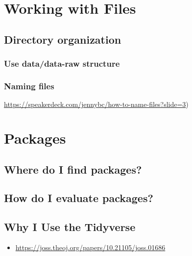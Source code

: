 \documentclass[]{book}
\providecommand{\tightlist}{%
  \setlength{\itemsep}{0pt}\setlength{\parskip}{0pt}}
\begin{document}
\hypertarget{working-with-files}{%
\section{Working with Files}\label{working-with-files}}

\hypertarget{directory-organization}{%
\subsection{Directory organization}\label{directory-organization}}

\hypertarget{use-datadata-raw-structure}{%
\subsubsection{Use data/data-raw structure}\label{use-datadata-raw-structure}}

\hypertarget{naming-files}{%
\subsubsection{Naming files}\label{naming-files}}

\url{https://speakerdeck.com/jennybc/how-to-name-files?slide=3})

\hypertarget{packages}{%
\section{Packages}\label{packages}}

\hypertarget{where-do-i-find-packages}{%
\subsection{Where do I find packages?}\label{where-do-i-find-packages}}

\hypertarget{how-do-i-evaluate-packages}{%
\subsection{How do I evaluate packages?}\label{how-do-i-evaluate-packages}}

\hypertarget{why-i-use-the-tidyverse}{%
\subsection{Why I Use the Tidyverse}\label{why-i-use-the-tidyverse}}

\begin{itemize}
\tightlist
\item
  \url{https://joss.theoj.org/papers/10.21105/joss.01686}
\end{itemize}
\end{document}
